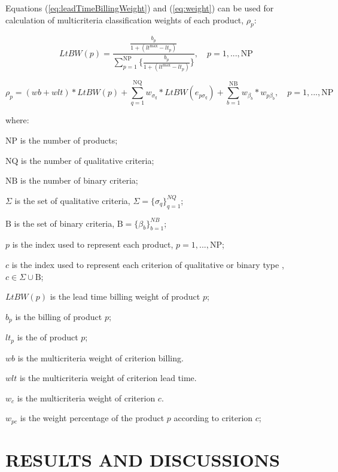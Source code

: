 \documentclass[10pt,fleqn,a4paper,twoside]{article}
\begin{document}
Equations (\ref{eq:leadTimeBillingWeight}) and (\ref{eq:weight}) can be used for calculation of multicriteria classification weights of each product, $\rho_{p}$:

\begin{equation}
	\label{eq:leadTimeBillingWeight}
	LtBW(p) = \frac{\frac{b_p}{1 + (lt^{\max} - lt_p)}}{\sum_{p=1}^{\textrm{NP}}{ \{ \frac{b_p}{1 + (lt^{\max} - lt_p)} \} }}, \quad p= 1,...,\textrm{NP}
\end{equation}

\begin{equation}
	\label{eq:weight}
	\rho_{p} = (wb + wlt) * LtBW(p) + \sum_{q=1}^{\textrm{NQ}}{w_{\sigma_q}* LtBW(e_{p\sigma_q})} + \sum_{b=1}^{\textrm{NB}}{w_{\beta_b}*w_{p\beta_b}}, \quad p= 1,...,\textrm{NP}
\end{equation}

where:

$\textrm{NP}$ is the number of products;

$\textrm{NQ}$ is the number of qualitative criteria;

$\textrm{NB}$ is the number of binary criteria;

$\Sigma$ is the set of qualitative criteria, \quad $\Sigma = \{\sigma_q\}_{q=1}^{NQ}$;

$\textrm{B}$ is the set of binary criteria, \quad $\textrm{B} = \{\beta_b\}_{b=1}^{NB}$;

$p$ is the index used to represent each product, \quad $p= 1,...,\textrm{NP}$;

$c$ is the index used to represent each criterion of qualitative or binary type , \quad $c \in \Sigma \cup \textrm{B}$;

$LtBW(p)$ is the lead time billing weight of product $p$;
 
$b_p$ is the billing of product $p$;

$lt_p$ is the of product $p$;

$wb$ is the multicriteria weight of criterion billing.

$wlt$ is the multicriteria weight of criterion lead time.

$w_{c}$ is the multicriteria weight of criterion $c$.

$w_{pc}$ is the weight percentage of the product $p$ according to criterion $c$;

    
    \section{RESULTS AND DISCUSSIONS}
    
\end{document}
